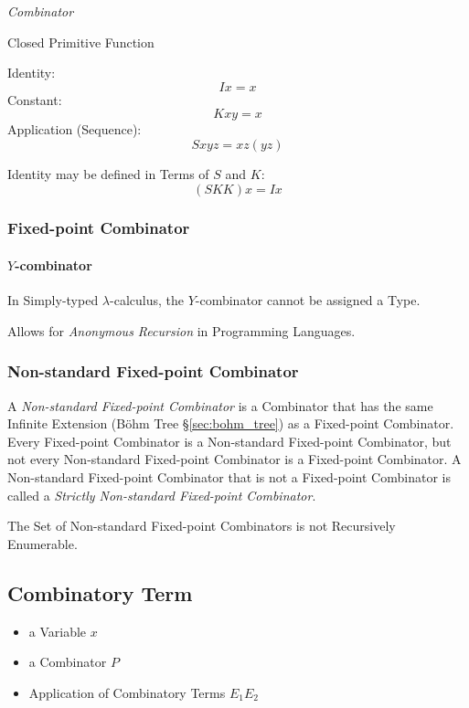 \emph{Combinator}

Closed Primitive Function

Identity:
\[
  I x = x
\]
Constant:
\[
  K x y = x
\]
Application (Sequence):
\[
  S x y z = x z (y z)
\]

Identity may be defined in Terms of $S$ and $K$:
\[
  (S K K) x = I x
\]



\subsubsection{Fixed-point Combinator}\label{sec:fixedpoint_combinator}

\paragraph{$Y$-combinator}\label{sec:y_combinator}

In Simply-typed $\lambda$-calculus, the $Y$-combinator cannot be
assigned a Type.

Allows for \emph{Anonymous Recursion} in Programming Languages.



\subsubsection{Non-standard Fixed-point Combinator}
\label{sec:nonstandard_combinator}

A \emph{Non-standard Fixed-point Combinator} is a Combinator that has
the same Infinite Extension (B\"ohm Tree \S\ref{sec:bohm_tree}) as a
Fixed-point Combinator. Every Fixed-point Combinator is a Non-standard
Fixed-point Combinator, but not every Non-standard Fixed-point
Combinator is a Fixed-point Combinator. A Non-standard Fixed-point
Combinator that is not a Fixed-point Combinator is called a
\emph{Strictly Non-standard Fixed-point Combinator}.

The Set of Non-standard Fixed-point Combinators is not Recursively
Enumerable. \cite{goldberg05}



\subsection{Combinatory Term}\label{sec:combinatory_term}

\begin{itemize}
  \item a Variable $x$
  \item a Combinator $P$
  \item Application of Combinatory Terms $E_1 E_2$
\end{itemize}



